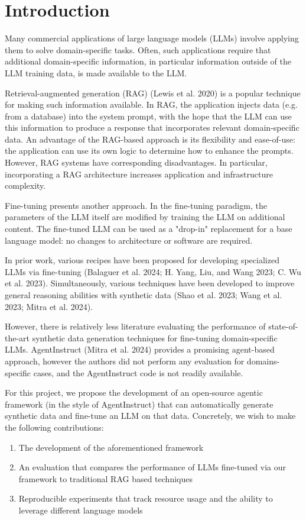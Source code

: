\section{Introduction}
Many commercial applications of large language models (LLMs) involve applying them to solve domain-specific tasks. Often, such applications require that additional domain-specific information, in particular information outside of the LLM training data, is made available to the LLM.

Retrieval-augmented generation (RAG) (Lewis et al. 2020)  is a popular technique for making such information available. In RAG, the application injects data (e.g. from a database) into the system prompt, with the hope that the LLM can use this information to produce a response that incorporates relevant domain-specific data. An advantage of the RAG-based approach is its flexibility and ease-of-use: the application can use its own logic to determine how to enhance the prompts. However, RAG systems have corresponding disadvantages. In particular, incorporating a RAG architecture increases application and infrastructure complexity.

Fine-tuning presents another approach. In the fine-tuning paradigm, the parameters of the LLM itself are modified by training the LLM on additional content. The fine-tuned LLM can be used as a "drop-in" replacement for a base language model: no changes to architecture or software are required.

In prior work, various recipes have been proposed for developing specialized LLMs via fine-tuning (Balaguer et al. 2024; H. Yang, Liu, and Wang 2023; C. Wu et al. 2023). Simultaneously, various techniques have been developed to improve general reasoning abilities with synthetic data (Shao et al. 2023; Wang et al. 2023; Mitra et al. 2024).

However, there is relatively less literature evaluating the performance of state-of-the-art synthetic data generation techniques for fine-tuning domain-specific LLMs. AgentInstruct (Mitra et al. 2024) provides a promising agent-based approach, however the authors did not perform any evaluation for domains-specific cases, and the AgentInstruct code is not readily available.

For this project, we propose the development of an open-source agentic framework (in the style of AgentInstruct) that can automatically generate synthetic data and fine-tune an LLM on that data. Concretely, we wish to make the following contributions:

\begin{enumerate}
\item The development of the aforementioned framework
\item An evaluation that compares the performance of LLMs fine-tuned via our framework to traditional RAG based techniques
\item Reproducible experiments that track resource usage and the ability to leverage different language models
\end{enumerate}
